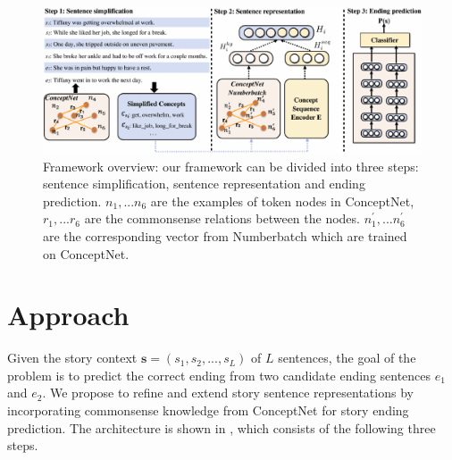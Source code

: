 \begin{figure}[th!]
\centering
\includegraphics[width=2\columnwidth]{pictures/model}
\caption{Framework overview: our framework can be divided into three steps: 
sentence simplification, sentence representation and ending prediction. 
${n_1,...n_6}$ are the examples of token nodes in ConceptNet, 
${r_1,...r_6}$  are the commonsense relations between the nodes. 
${n_1^{'},...n_6^{'}}$ are the corresponding vector from Numberbatch\protect\footnotemark 
 which are trained on ConceptNet.
}
\label{fig:model}
\end{figure}

\section{Approach}
\label{sec:approach}




Given the story context $\textbf{s} = (s_1, s_2, ..., s_L)$ of $L$ sentences,
the goal of the problem is to predict the correct ending from 
two candidate ending sentences $e_1$ and $e_2$.
We propose to refine and extend story sentence representations
by incorporating commonsense knowledge from ConceptNet for story ending prediction.
The architecture is shown in , which consists of 
the following three steps. 

